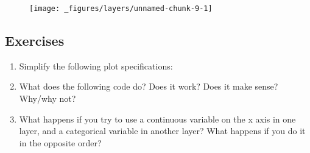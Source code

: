 \begin{figure}[H]
  \centering
  \texttt{[image: \_figures/layers/unnamed-chunk-9-1]}
\end{figure}

\subsection{Exercises}\label{exercises-1}

\begin{enumerate}
\def\labelenumi{\arabic{enumi}.}
\item
  Simplify the following plot specifications:

\begin{Shaded}
\begin{Highlighting}[]
\StringTok{ }
\StringTok{  }\NormalTok{(}

\NormalTok{() +}\StringTok{ }
\StringTok{ }\NormalTok{(} \NormalTok{(}   
\StringTok{ }\NormalTok{(}  

\StringTok{ }
\StringTok{  }\NormalTok{(}\NormalTok{(} 
\end{Highlighting}
\end{Shaded}
\item
  What does the following code do? Does it work? Does it make sense?
  Why/why not?

\begin{Shaded}
\begin{Highlighting}[]
\StringTok{  }\NormalTok{(}\StringTok{ }
\StringTok{  }\NormalTok{(}
\end{Highlighting}
\end{Shaded}
\item
  What happens if you try to use a continuous variable on the x axis in
  one layer, and a categorical variable in another layer? What happens
  if you do it in the opposite order?
\end{enumerate}

